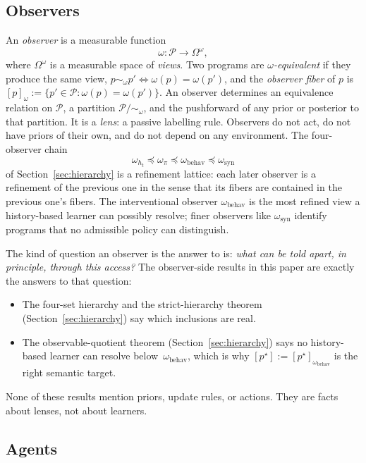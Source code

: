 \documentclass[11pt]{article}
\theoremstyle{definition}
\theoremstyle{remark}
\theoremstyle{plain}
\theoremstyle{definition}
\newcommand{\Pcal}{\mathcal{P}}
\begin{document}
\subsection{Observers}
\label{sec:ontology-observers}

An \emph{observer} is a measurable function
\[
\omega:\Pcal\longrightarrow\Omega^\omega,
\]
where $\Omega^\omega$ is a measurable space of \emph{views}. Two programs are \emph{$\omega$-equivalent} if they produce the same view, $p\sim_\omega p'\iff\omega(p)=\omega(p')$, and the \emph{observer fiber} of $p$ is $[p]_\omega:=\{p'\in\Pcal:\omega(p)=\omega(p')\}$. An observer determines an equivalence relation on $\Pcal$, a partition $\Pcal/\!\sim_\omega$, and the pushforward of any prior or posterior to that partition. It is a \emph{lens}: a passive labelling rule. Observers do not act, do not have priors of their own, and do not depend on any environment. The four-observer chain
\[
\omega_{h_t}\preceq\omega_\pi\preceq\omega_{\mathrm{behav}}\preceq\omega_{\mathrm{syn}}
\]
of Section~\ref{sec:hierarchy} is a refinement lattice: each later observer is a refinement of the previous one in the sense that its fibers are contained in the previous one's fibers. The interventional observer $\omega_{\mathrm{behav}}$ is the most refined view a history-based learner can possibly resolve; finer observers like $\omega_{\mathrm{syn}}$ identify programs that no admissible policy can distinguish.

The kind of question an observer is the answer to is: \emph{what can be told apart, in principle, through this access?} The observer-side results in this paper are exactly the answers to that question:
\begin{itemize}
\item The four-set hierarchy and the strict-hierarchy theorem (Section~\ref{sec:hierarchy}) say which inclusions are real.
\item The observable-quotient theorem (Section~\ref{sec:hierarchy}) says no history-based learner can resolve below~$\omega_{\mathrm{behav}}$, which is why $[p^\star]:=[p^\star]_{\omega_{\mathrm{behav}}}$ is the right semantic target.
\end{itemize}
None of these results mention priors, update rules, or actions. They are facts about lenses, not about learners.

\subsection{Agents}
\label{sec:ontology-agents}
\end{document}
